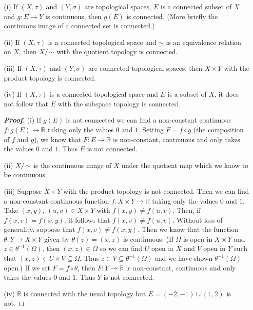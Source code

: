 \begin{theorem}\label{T;quotient connected}
(i) If $(X,\tau)$ and $(Y,\sigma)$ are topological spaces,
$E$ is a connected subset of $X$ and $g:E\rightarrow Y$
is continuous, then $g(E)$ is connected.
(More briefly the continuous image of a connected
set is connected.)

(ii) If $(X,\tau)$ is a connected topological space
and $\sim$ is an equivalence relation on $X$, then $X/\negthinspace\sim$
with the quotient topology is connected.

(iii) If $(X,\tau)$ and $(Y,\sigma)$ are
connected topological spaces, then $X\times Y$
with the product topology is connected.

(iv) If $(X,\tau)$ is a
connected topological space and $E$ is a subset of $X$,
it does not follow that $E$ with the subspace topology is connected.
\end{theorem}
\begin{proof}[\bf Proof] (i) If $g(E)$ is not connected we can find a non-constant
continuous
$f:g(E)\rightarrow{\mathbb R}$ taking only the values $0$ and $1$.
Setting $F=f\circ g$ (the composition of $f$ and $g$),
we know that $F:E\rightarrow{\mathbb R}$ is non-constant,
continuous and only takes the values $0$ and $1$.
Thus $E$ is not connected.

(ii) $X/\negthinspace\sim$ is the continuous image of $X$ under the
quotient map which we know to be continuous.

(iii) Suppose $X\times Y$ with the product topology
is not connected. Then we can find
a non-constant continuous function
$f:X\times Y\rightarrow{\mathbb R}$ taking only the values $0$ and $1$.
Take $(x,y),\,(u,v)\in X\times Y$ with $f(x,y)\neq f(u,v)$.
Then, if $f(x,v)=f(x,y)$, it follows that $f(x,v)\neq f(u,v)$.
Without loss of generality, suppose that $f(x,v)\neq f(x,y)$.
Then we know that the function $\theta:Y\rightarrow X\times Y$
given by $\theta(z)=(x,z)$ is continuous.
(If $\Omega$ is open in $X\times Y$ and $z\in\theta^{-1}(\Omega)$,
then $(x,z)\in\Omega$ so we can find $U$ open in $X$
and $V$ open in $Y$ such that
$(x,z)\in U\times V\subseteq \Omega$. Thus
$z\in V\subseteq \theta^{-1}(\Omega)$
and we have shown $\theta^{-1}(\Omega)$ open.)
If we set $F=f\circ\theta$, then
$F:Y\rightarrow{\mathbb R}$ is non-constant,
continuous and only takes the values $0$ and $1$.
Thus $Y$ is not connected.

(iv) ${\mathbb R}$ is connected with the usual topology
but $E=(-2,-1)\cup(1,2)$ is not.
\end{proof}

